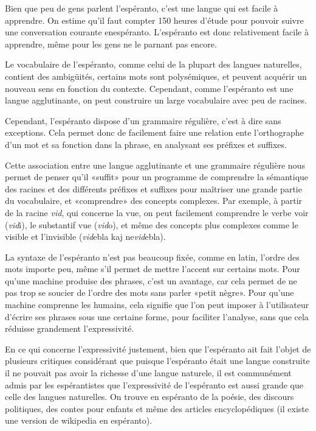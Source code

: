 \documentclass[french,a4paper]{article}
\begin{document}
Bien que peu de gens parlent l'espéranto, c'est une langue qui est
facile à apprendre. On estime qu'il faut compter 150 heures d'étude
pour pouvoir suivre une conversation courante enespéranto. L'espéranto
est donc relativement facile à apprendre, même pour les gens ne le
parnant pas encore.

Le vocabulaire de l'espéranto, comme celui de la plupart des langues
naturelles, contient des ambigüités, certains mots sont polysémiques,
et peuvent acquérir un nouveau sens en fonction du
contexte. Cependant, comme l'espéranto est une langue agglutinante, on
peut construire un large vocabulaire avec peu de racines. 

Cependant, l'espéranto dispose d'un grammaire régulière, c'est à dire
sans exceptions. Cela permet donc de facilement faire une relation
ente l'orthographe d'un mot et sa fonction dans la phrase, en
analysant ses préfixes et suffixes.

Cette association entre une langue agglutinante et une grammaire
régulière nous permet de penser qu'il «suffit» pour un programme de
comprendre la sémantique des racines et des différents préfixes et
suffixes pour maîtriser une grande partie du vocabulaire, et
«comprendre» des concepts complexes. Par exemple, à partir de la
racine \emph{vid}, qui concerne la vue, on peut facilement comprendre
le verbe voir (\emph{vid}i), le substantif vue (\emph{vid}o), et même
des concepts plus complexes comme le visible et l'invisible
(\emph{vid}ebla kaj ne\emph{vid}ebla).

La syntaxe de l'espéranto n'est pas beaucoup fixée, comme en latin,
l'ordre des mots importe peu, même s'il permet de mettre l'accent sur
certains mots. Pour qu'une machine produise des phrases, c'est un
avantage, car cela permet de ne pas trop se soucier de l'ordre des
mots sans parler «petit nègre». Pour qu'une machine comprenne les
humains, cela signifie que l'on peut imposer à l'utilisateur d'écrire
ses phrases sous une certaine forme, pour faciliter l'analyse, sans
que cela réduisse grandement l'expressivité.

En ce qui concerne l'expressivité justement, bien que l'espéranto ait
fait l'objet de plusieurs critiques considérant que puisque
l'espéranto était une langue construite il ne pouvait pas avoir la
richesse d'une langue naturele, il est communément admis par les
espérantistes que l'expressivité de l'espéranto est aussi grande que
celle des langues naturelles. On trouve en espéranto de la poésie, des
discours politiques, des contes pour enfants et même des articles
encyclopédiques (il existe une version de wikipedia en espéranto).
\end{document}
